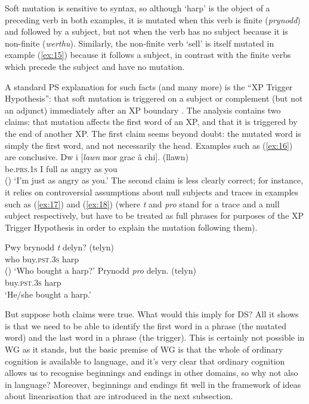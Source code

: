 \documentclass[output=paper
 	        ,biblatex
                ,babelshorthands
                ,newtxmath
                ,draftmode
                ,colorlinks, citecolor=brown
]{langscibook}
\begin{document}
\noindent
Soft mutation is sensitive to syntax, so although `harp' is the object of a preceding verb in both
examples, it is mutated when this verb is finite (\emph{prynodd}) and followed by a subject, but not
when the verb has no subject because it is non-finite (\emph{werthu}). Similarly, the non-finite
verb `sell' is itself mutated in example (\ref{ex:15}) because it follows a subject, in contrast
with the finite verbs which precede the subject and have no mutation.

A standard PS explanation for such facts (and many more) is the ``XP Trigger Hypothesis'': that soft
mutation is triggered on a subject or complement (but not an adjunct) immediately after an XP
boundary \citep[226]{BorsleyTallermanWillis2007}. The analysis contains two claims: that mutation
affects the first word of an XP, and that it is triggered by the end of another XP. The first claim
seems beyond doubt: the mutated word is simply the first word, and not necessarily the
head. Examples such as (\ref{ex:16}) are conclusive.
%
\ea
\label{ex:16}
\gll Dw                          i [\emph{lawn}   mor grac  â  chi]. (llawn)\\
     be.\textsc{prs}.1\textsc{s} I \spacebr{}full as  angry as you\\\hfill()
\glt `I'm just as angry as you.'
\z
%
\noindent
The second claim is less clearly correct; for instance, it relies on controversial assumptions about
null subjects and traces in examples such as (\ref{ex:17}) and (\ref{ex:18}) (where \emph{t} and
\emph{pro} stand for a trace and a null subject respectively, but have to be treated as full phrases
for purposes of the XP Trigger Hypothesis in order to explain the mutation following them).
%
\begin{exe}
\ex \label{ex:17}
\gll Pwy brynodd \emph{t} delyn? (telyn)\\
     who buy.\textsc{pst}.3\textsc{s} {} harp\\\hfill()
\glt `Who bought a harp?'
\ex \label{ex:18}
\gll Prynodd \emph{pro} delyn. (telyn)\\
     buy.\textsc{pst}.3\textsc{s} {} harp\\
\glt `He/she bought a harp.'
\end{exe}
%
\noindent
But suppose both claims were true. What would this imply for DS? All it shows is that we need to be
able to identify the first word in a phrase (the mutated word) and the last word in a phrase (the
trigger). This is certainly not possible in WG as it stands, but the basic premise of WG is that the
whole of ordinary cognition is available to language, and it's very clear that ordinary cognition
allows us to recognise beginnings and endings in other domains, so why not also in language?
Moreover, beginnings and endings fit well in the framework of ideas about linearisation that are
introduced in the next subsection.
\end{document}
